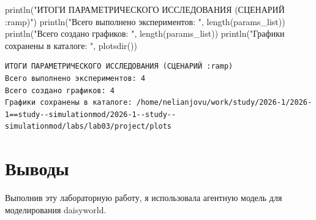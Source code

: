 \documentclass[
  12pt,
  a4paper,
  DIV=11,
  numbers=noendperiod]{scrreprt}
\newenvironment{Shaded}{\begin{snugshade}}{\end{snugshade}}
\newcommand{\FunctionTok}[1]{\textcolor[rgb]{0.28,0.35,0.67}{#1}}
\newcommand{\NormalTok}[1]{\textcolor[rgb]{0.00,0.23,0.31}{#1}}
\newcommand{\StringTok}[1]{\textcolor[rgb]{0.13,0.47,0.30}{#1}}
\begin{document}
\begin{Shaded}
\begin{Highlighting}[]
\FunctionTok{println}\NormalTok{(}\StringTok{"ИТОГИ ПАРАМЕТРИЧЕСКОГО ИССЛЕДОВАНИЯ (СЦЕНАРИЙ :ramp)"}\NormalTok{)}
\FunctionTok{println}\NormalTok{(}\StringTok{"Всего выполнено экспериментов: "}\NormalTok{, }\FunctionTok{length}\NormalTok{(params\_list))}
\FunctionTok{println}\NormalTok{(}\StringTok{"Всего создано графиков: "}\NormalTok{, }\FunctionTok{length}\NormalTok{(params\_list))}
\FunctionTok{println}\NormalTok{(}\StringTok{"Графики сохранены в каталоге: "}\NormalTok{, }\FunctionTok{plotsdir}\NormalTok{())}
\end{Highlighting}
\end{Shaded}

\begin{verbatim}
ИТОГИ ПАРАМЕТРИЧЕСКОГО ИССЛЕДОВАНИЯ (СЦЕНАРИЙ :ramp)
Всего выполнено экспериментов: 4
Всего создано графиков: 4
Графики сохранены в каталоге: /home/nelianjovu/work/study/2026-1/2026-1==study--simulationmod/2026-1--study--simulationmod/labs/lab03/project/plots
\end{verbatim}

\chapter{Выводы}\label{ux432ux44bux432ux43eux434ux44b}

Выполнив эту лабораторную работу, я использовала агентную модель для
моделирования daisyworld.


\printbibliography
\end{document}
